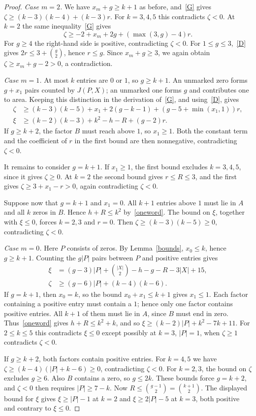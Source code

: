 \documentclass[11pt]{article}
\begin{document}
\begin{proof}
\noindent\emph{Case $m=2$.} We have $x_m+g\ge k+1$ as before, and~\eqref{G} gives $\zeta\ge(k-3)(k-4)+(k-3)r$. For $k=3,4,5$ this contradicts $\zeta<0$. At $k=2$ the same inequality~\eqref{G} gives
\[
 \zeta\ge-2+x_m+2g+(\max(3,g)-4)r.
\]
For $g\ge4$ the right-hand side is positive, contradicting $\zeta<0$. For $1\le g\le3$,~\eqref{D} gives $2r\le3+\binom g2$, hence $r\le g$. Since $x_m+g\ge3$, we again obtain $\zeta\ge x_m+g-2>0$, a contradiction.

\noindent\emph{Case $m=1$.} At most $k$ entries are $0$ or $1$, so $g\ge k+1$. An unmarked zero forms $g+x_1$ pairs counted by $J(P,X)$; an unmarked one forms $g$ and contributes one to area. Keeping this distinction in the derivation of~\eqref{G}, and using~\eqref{D}, gives
\begin{align*}
 \zeta&\ge (k-3)(k-5)+x_1+2(g-k-1)+(g-5+\min(x_1,1))r,\\
 \xi&\ge (k-2)(k-3)+k^2-h-R+(g-2)r.
\end{align*}
If $g\ge k+2$, the factor $B$ must reach above $1$, so $x_1\ge1$. Both the constant term and the coefficient of $r$ in the first bound are then nonnegative, contradicting $\zeta<0$.

It remains to consider $g=k+1$. If $x_1\ge1$, the first bound excludes $k=3,4,5$, since it gives $\zeta\ge0$. At $k=2$ the second bound gives $r\le R\le3$, and the first gives $\zeta\ge3+x_1-r>0$, again contradicting $\zeta<0$.

Suppose now that $g=k+1$ and $x_1=0$. All $k+1$ entries above $1$ must lie in $A$ and all $k$ zeros in $B$. Hence $h+R\le k^2$ by~\eqref{oneword}. The bound on $\xi$, together with $\xi\le0$, forces $k=2,3$ and $r=0$. Then $\zeta\ge(k-3)(k-5)\ge0$, contradicting $\zeta<0$.

\noindent\emph{Case $m=0$.} Here $P$ consists of zeros. By Lemma~\ref{bounds}, $x_0\le k$, hence $g\ge k+1$. Counting the $g|P|$ pairs between $P$ and positive entries gives
\begin{align*}
 \xi&=(g-3)|P|+\binom{|X|}{2}-h-g-R-3|X|+15,\\
 \zeta&\ge(g-6)|P|+(k-4)(k-6).
\end{align*}
If $g=k+1$, then $x_0=k$, so the bound $x_0+x_1\le k+1$ gives $x_1\le1$. Each factor containing a positive entry must contain a $1$; hence only one factor contains positive entries. All $k+1$ of them must lie in $A$, since $B$ must end in zero. Thus~\eqref{oneword} gives $h+R\le k^2+k$, and so $\xi\ge(k-2)|P|+k^2-7k+11$. For $2\le k\le5$ this contradicts $\xi\le0$ except possibly at $k=3$, $|P|=1$, when $\zeta\ge1$ contradicts $\zeta<0$.

If $g\ge k+2$, both factors contain positive entries. For $k=4,5$ we have $\zeta\ge(k-4)(|P|+k-6)\ge0$, contradicting $\zeta<0$. For $k=2,3$, the bound on $\zeta$ excludes $g\ge6$. Also $B$ contains a zero, so $g\le2k$. These bounds force $g=k+2$, and $\zeta<0$ then requires $|P|\ge7-k$. Now $R\le\binom{g-1}2=\binom{k+1}2$. The displayed bound for $\xi$ gives $\xi\ge |P|-1$ at $k=2$ and $\xi\ge2|P|-5$ at $k=3$, both positive and contrary to $\xi\le0$.
\end{proof}
\end{document}
